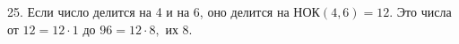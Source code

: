 25. Если число делится на 4 и на 6, оно делится на НОК$(4,6)=12.$ Это числа от $12=12\cdot1$ до $96=12\cdot8,$ их 8.\\
